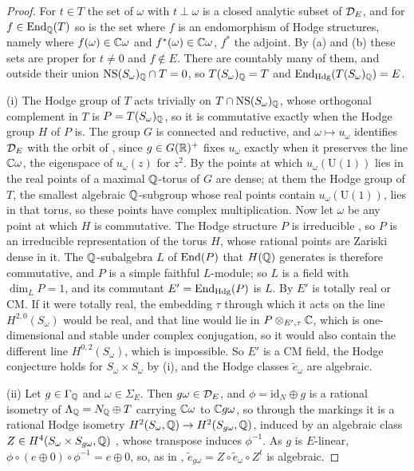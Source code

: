 \begin{proof}
For $t\in T$ the set of $\omega$ with $t\perp\omega$ is a closed analytic
subset of $\mathcal{D}_{E}$, and for $f\in\operatorname{End}_{\mathbb{Q}}(T)$ so is the set where $f$ is
an endomorphism of Hodge structures, namely where $f(\omega)\in\mathbb{C}\omega$ and
$f^{*}(\omega)\in\mathbb{C}\omega$, $f^{*}$ the adjoint. By (a) and (b) these sets
are proper for $t\ne0$ and $f\notin E$. There are countably many of them, and
outside their union $\mathrm{NS}(S_{\omega})_{\mathbb{Q}}\cap T=0$, so
$T(S_{\omega})_{\mathbb{Q}}=T$ and $\operatorname{End}_{\mathrm{Hdg}}(T(S_{\omega})_{\mathbb{Q}})=E$.

(i) The Hodge group of $T$ acts trivially on $T\cap\mathrm{NS}(S_{\omega})_{\mathbb{Q}}$,
whose orthogonal complement in $T$ is $P=T(S_{\omega})_{\mathbb{Q}}$, so it is
commutative exactly when the Hodge group $H$ of $P$ is. The group $G$ is
connected and reductive, and $\omega\mapsto u_{\omega}$ identifies $\mathcal{D}_{E}$
with the orbit of , since $g\in G(\mathbb{R})^{+}$ fixes
$u_{\omega}$ exactly when it preserves the line $\mathbb{C}\omega$, the eigenspace
of $u_{\omega}(z)$ for $z^{2}$. By  the points at which
$u_{\omega}(\mathrm{U}(1))$ lies in the real points of a maximal $\mathbb{Q}$-torus of
$G$ are dense; at them the Hodge group of $T$, the smallest algebraic
$\mathbb{Q}$-subgroup whose real points contain $u_{\omega}(\mathrm{U}(1))$, lies in
that torus, so these points have complex multiplication. Now let $\omega$ be
any point at which $H$ is commutative. The Hodge structure $P$ is
irreducible \cite{Zar83}, so $P$ is an irreducible representation of the
torus $H$, whose rational points are Zariski dense in it. The
$\mathbb{Q}$-subalgebra $L$ of $\operatorname{End}(P)$ that $H(\mathbb{Q})$ generates is therefore
commutative, and $P$ is a simple faithful $L$-module; so $L$ is a field with
$\dim_{L}P=1$, and its commutant $E'=\operatorname{End}_{\mathrm{Hdg}}(P)$ is $L$. By
\cite{Zar83} $E'$ is totally real or CM. If it were totally real, the
embedding $\tau$ through which it acts on the line $H^{2,0}(S_{\omega})$
would be real, and that line would lie in $P\otimes_{E',\tau}\mathbb{C}$, which is
one-dimensional and stable under complex conjugation, so it would also
contain the different line $H^{0,2}(S_{\omega})$, which is impossible. So
$E'$ is a CM field, the Hodge conjecture
holds for $S_{\omega}\times S_{\omega}$ by (i), and the
Hodge classes $\tilde e_{\omega}$ are algebraic.

(ii) Let $g\in\Gamma_{\mathbb{Q}}$ and $\omega\in\Sigma_{E}$. Then $g\omega\in\mathcal{D}_{E}$,
and $\phi=\mathrm{id}_{N}\oplus g$ is a rational isometry of
$\Lambda_{\mathbb{Q}}=N_{\mathbb{Q}}\oplus T$ carrying $\mathbb{C}\omega$ to $\mathbb{C} g\omega$, so
through the markings it is a rational Hodge isometry
$H^{2}(S_{\omega},\mathbb{Q})\to H^{2}(S_{g\omega},\mathbb{Q})$, induced by an algebraic
class $Z\in H^{4}(S_{\omega}\times S_{g\omega},\mathbb{Q})$ \cite{Bus19}, whose
transpose induces $\phi^{-1}$. As $g$ is $E$-linear,
$\phi\circ(e\oplus0)\circ\phi^{-1}=e\oplus0$, so, as in ,
$\tilde e_{g\omega}=Z\circ\tilde e_{\omega}\circ Z^{t}$ is algebraic.


\end{proof}
